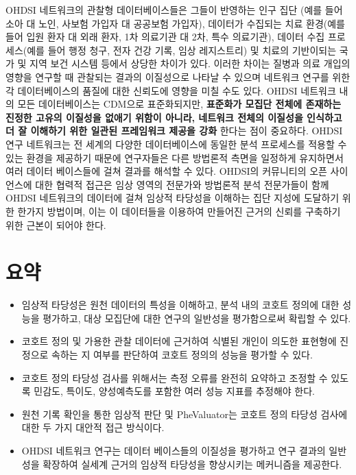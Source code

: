 \documentclass[10.5pt]{book}
\providecommand{\tightlist}{%
  \setlength{\itemsep}{0pt}\setlength{\parskip}{0pt}}
\theoremstyle{definition}
\theoremstyle{definition}
\theoremstyle{definition}
\theoremstyle{remark}
\let\BeginKnitrBlock\begin \let\EndKnitrBlock\end
\begin{document}
OHDSI 네트워크의 관찰형 데이터베이스들은 그들이 반영하는 인구 집단 (예를
들어 소아 대 노인, 사보험 가입자 대 공공보험 가입자), 데이터가 수집되는
치료 환경(예를 들어 입원 환자 대 외래 환자, 1차 의료기관 대 2차, 특수
의료기관), 데이터 수집 프로세스(예를 들어 행정 청구, 전자 건강 기록,
임상 레지스트리) 및 치료의 기반이되는 국가 및 지역 보건 시스템 등에서
상당한 차이가 있다. 이러한 차이는 질병과 의료 개입의 영향을 연구할 때
관찰되는 결과의 이질성으로 나타날 수 있으며 네트워크 연구를 위한 각
데이터베이스의 품질에 대한 신뢰도에 영향을 미칠 수도 있다. OHDSI
네트워크 내의 모든 데이터베이스는 CDM으로 표준화되지만, \textbf{표준화가
모집단 전체에 존재하는 진정한 고유의 이질성을 없애기 위함이 아니라,
네트워크 전체의 이질성을 인식하고 더 잘 이해하기 위한 일관된 프레임워크
제공을 강화} 한다는 점이 중요하다. OHDSI 연구 네트워크는 전 세계의
다양한 데이터베이스에 동일한 분석 프로세스를 적용할 수 있는 환경을
제공하기 때문에 연구자들은 다른 방법론적 측면을 일정하게 유지하면서 여러
데이터 베이스들에 걸쳐 결과를 해석할 수 있다. OHDSI의 커뮤니티의 오픈
사이언스에 대한 협력적 접근은 임상 영역의 전문가와 방법론적 분석
전문가들이 함께 OHDSI 네트워크의 데이터에 걸쳐 임상적 타당성을 이해하는
집단 지성에 도달하기 위한 한가지 방법이며, 이는 이 데이터들을 이용하여
만들어진 근거의 신뢰를 구축하기 위한 근본이 되어야 한다.

\section{요약}\label{-14}

\BeginKnitrBlock{rmdsummary}
\begin{itemize}
\tightlist
\item
  임상적 타당성은 원천 데이터의 특성을 이해하고, 분석 내의 코호트 정의에
  대한 성능을 평가하고, 대상 모집단에 대한 연구의 일반성을 평가함으로써
  확립할 수 있다.
\item
  코호트 정의 및 가용한 관찰 데이터에 근거하여 식별된 개인이 의도한
  표현형에 진정으로 속하는 지 여부를 판단하여 코호트 정의의 성능을
  평가할 수 있다.
\item
  코호트 정의 타당성 검사를 위해서는 측정 오류를 완전히 요약하고 조정할
  수 있도록 민감도, 특이도, 양성예측도를 포함한 여러 성능 지표를
  추정해야 한다.
\item
  원천 기록 확인을 통한 임상적 판단 및 PheValuator는 코호트 정의 타당성
  검사에 대한 두 가지 대안적 접근 방식이다.
\item
  OHDSI 네트워크 연구는 데이터 베이스들의 이질성을 평가하고 연구 결과의
  일반성을 확장하여 실세계 근거의 임상적 타당성을 향상시키는 메커니즘을
  제공한다.
\end{itemize}
\EndKnitrBlock{rmdsummary}
\end{document}
